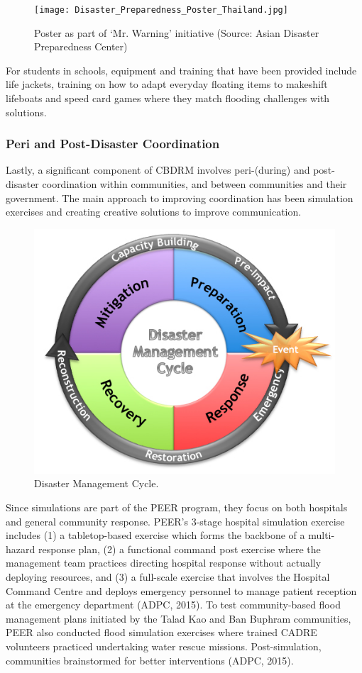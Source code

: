 \begin{figure}[htb]
	\centering
		\texttt{[image: Disaster\_Preparedness\_Poster\_Thailand.jpg]}
	\caption{Poster as part of ‘Mr. Warning' initiative (Source: Asian Disaster Preparedness Center)}
	\label{fig:Disaster_Preparedness_Poster_Thailand}
\end{figure}

For students in schools, equipment and training that have been provided include life jackets, training on how to adapt everyday floating items to makeshift lifeboats and speed card games where they match flooding challenges with solutions.

\subsubsection{Peri and Post-Disaster Coordination}

Lastly, a significant component of CBDRM involves peri-(during) and post-disaster coordination within communities, and between communities and their government. The main approach to improving coordination has been simulation exercises and creating creative solutions to improve communication.

\begin{figure}[htb]
	\centering
		\includegraphics[width=.5\textwidth]{graphics/Disaster_Capacity_Building.jpg}
	\caption{Disaster Management Cycle.  }
	\label{fig:Disaster_Capacity_Building}
\end{figure}

Since simulations are part of the PEER program, they focus on both hospitals and general community response. PEER's 3-stage hospital simulation exercise includes (1) a tabletop-based exercise which forms the backbone of a multi-hazard response plan, (2) a functional command post exercise where the management team practices directing hospital response without actually deploying resources, and (3) a full-scale exercise that involves the Hospital Command Centre and deploys emergency personnel to manage patient reception at the emergency department (ADPC, 2015). To test community-based flood management plans initiated by the Talad Kao and Ban Buphram communities, PEER also conducted flood simulation exercises where trained CADRE volunteers practiced undertaking water rescue missions. Post-simulation, communities brainstormed for better interventions (ADPC, 2015).

